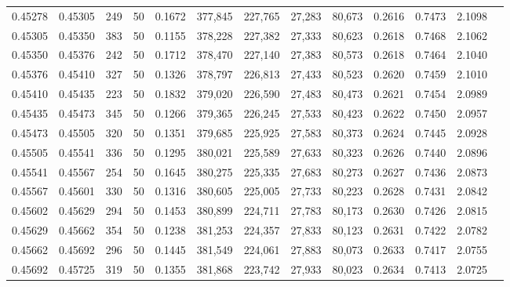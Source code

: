 \begin{tabular}{rrrrrrrrrrrrr}
0.45278 & 0.45305 &   249 &  50 &                                     0.1672 & 377,845 & 227,765 &  27,283 &  80,673 & 0.2616 & 0.7473 & 2.1098 \\
0.45305 & 0.45350 &   383 &  50 &                                     0.1155 & 378,228 & 227,382 &  27,333 &  80,623 & 0.2618 & 0.7468 & 2.1062 \\
0.45350 & 0.45376 &   242 &  50 &                                     0.1712 & 378,470 & 227,140 &  27,383 &  80,573 & 0.2618 & 0.7464 & 2.1040 \\
0.45376 & 0.45410 &   327 &  50 &                                     0.1326 & 378,797 & 226,813 &  27,433 &  80,523 & 0.2620 & 0.7459 & 2.1010 \\
0.45410 & 0.45435 &   223 &  50 &                                     0.1832 & 379,020 & 226,590 &  27,483 &  80,473 & 0.2621 & 0.7454 & 2.0989 \\
0.45435 & 0.45473 &   345 &  50 &                                     0.1266 & 379,365 & 226,245 &  27,533 &  80,423 & 0.2622 & 0.7450 & 2.0957 \\
0.45473 & 0.45505 &   320 &  50 &                                     0.1351 & 379,685 & 225,925 &  27,583 &  80,373 & 0.2624 & 0.7445 & 2.0928 \\
0.45505 & 0.45541 &   336 &  50 &                                     0.1295 & 380,021 & 225,589 &  27,633 &  80,323 & 0.2626 & 0.7440 & 2.0896 \\
0.45541 & 0.45567 &   254 &  50 &                                     0.1645 & 380,275 & 225,335 &  27,683 &  80,273 & 0.2627 & 0.7436 & 2.0873 \\
0.45567 & 0.45601 &   330 &  50 &                                     0.1316 & 380,605 & 225,005 &  27,733 &  80,223 & 0.2628 & 0.7431 & 2.0842 \\
0.45602 & 0.45629 &   294 &  50 &                                     0.1453 & 380,899 & 224,711 &  27,783 &  80,173 & 0.2630 & 0.7426 & 2.0815 \\
0.45629 & 0.45662 &   354 &  50 &                                     0.1238 & 381,253 & 224,357 &  27,833 &  80,123 & 0.2631 & 0.7422 & 2.0782 \\
0.45662 & 0.45692 &   296 &  50 &                                     0.1445 & 381,549 & 224,061 &  27,883 &  80,073 & 0.2633 & 0.7417 & 2.0755 \\
0.45692 & 0.45725 &   319 &  50 &                                     0.1355 & 381,868 & 223,742 &  27,933 &  80,023 & 0.2634 & 0.7413 & 2.0725 \\

\end{tabular}
